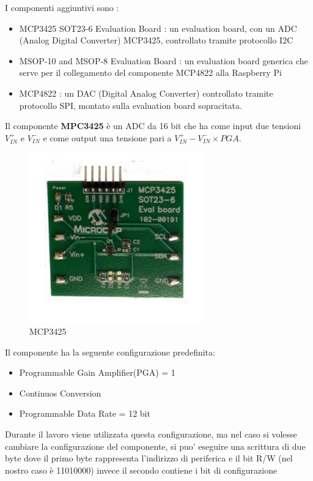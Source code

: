 \documentclass[12pt, a4paper, titlepage, oneside]{book}
\begin{document}
\begin{flushleft}
I componenti aggiuntivi sono :
\begin{itemize}
    \item MCP3425 SOT23-6 Evaluation Board  \cite{microchipMCP3425}: un evaluation board, con un ADC (Analog Digital Converter) MCP3425, controllato tramite protocollo I2C
    \item MSOP-10 and MSOP-8 Evaluation Board \cite{microchipMSOP10-8}: un evaluation board generica che serve per il collegamento del componente MCP4822 alla Raspberry Pi
    \item MCP4822 \cite{microchipMCP4822}: un DAC (Digital Analog Converter) controllato tramite protocollo SPI, montato sulla evaluation board sopracitata.
\end{itemize}
\newpage
Il componente \textbf{MPC3425} è un ADC da 16 bit che ha come input due tensioni $V_{IN}^+ $ e $ V_{IN}^-$ e come output una tensione pari a $V_{IN}^+ - V_{IN}^- \times PGA$.\\ 
\begin{figure}[h]
    \centering
    \includegraphics{MCP3425.JPG}
    \caption{MCP3425}
    \label{fig:MCP3425}
\end{figure}
Il componente ha la seguente configurazione predefinita:
\begin{itemize}
    \item Programmable Gain Amplifier(PGA) = 1
    \item Continuos Conversion
    \item Programmable Data Rate = 12 bit
\end{itemize}
Durante il lavoro viene utilizzata questa configurazione, ma nel caso si volesse cambiare la configurazione del componente, si puo' eseguire una scrittura di due byte dove il primo byte rappresenta l'indirizzo di periferica e il bit R/W (nel nostro caso è 11010000) invece il secondo contiene i bit di configurazione\\

\end{flushleft}
\end{document}
